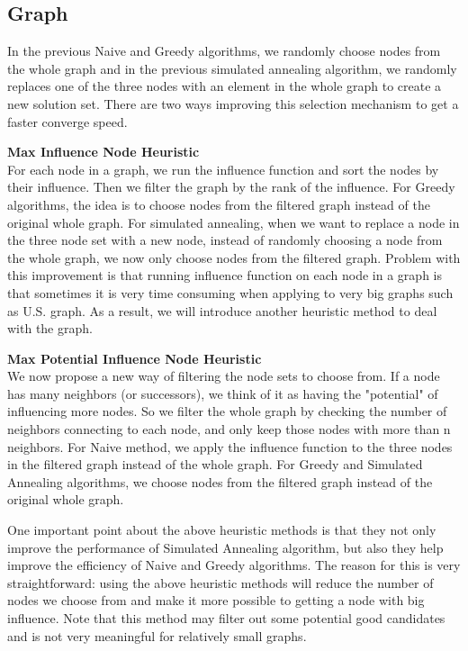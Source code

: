\documentclass{article}
\begin{document}
\subsection{Graph}   %
In the previous Naive and Greedy algorithms, we randomly choose nodes from the whole graph and in the previous simulated annealing algorithm, we randomly replaces one of the three nodes with an element in the whole graph to create a new solution set. There are two ways improving this selection mechanism to get a faster converge speed.

\begin{enumerate}
\begin{item}%
\textbf{Max Influence Node Heuristic}\\
For each node in a graph, we run the influence function and sort the nodes by their influence. Then we filter the graph by the rank of the influence. For Greedy algorithms, the idea is to choose nodes from the filtered graph instead of the original whole graph. For simulated annealing, when we want to replace a node in the three node set with a new node, instead of randomly choosing a node from the whole graph, we now only choose nodes from the filtered graph. Problem with this improvement is that running influence function on each node in a graph is that sometimes it is very time consuming when applying to very big graphs such as U.S. graph.  As a result, we will introduce another heuristic method to deal with the graph.
\end{item}

\begin{item}%
\textbf{Max Potential Influence Node Heuristic}\\
We now propose a new way of filtering the node sets to choose from. If a node has many neighbors (or successors), we think of it as having the "potential" of influencing more nodes. So we filter the whole graph by checking the number of neighbors connecting to each node, and only keep those nodes with more than n neighbors. For Naive method, we apply the influence function to the three nodes in the filtered graph instead of the whole graph. For Greedy and Simulated Annealing algorithms, we choose nodes from the filtered graph instead of the original whole graph.
\end{item}
\end{enumerate}

One important point about the above heuristic methods is that they not only improve the performance of Simulated Annealing algorithm, but also they help improve the efficiency of Naive and Greedy algorithms. The reason for this is very straightforward: using the above heuristic methods will reduce the number of nodes we choose from and make it more possible to getting a node with big influence. Note that this method may filter out some potential good candidates and is not very meaningful for relatively small graphs. 
\end{document}
